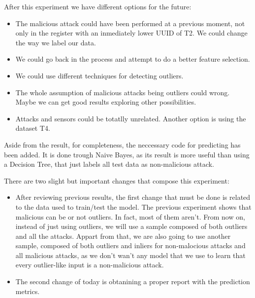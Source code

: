\documentclass[idxtotoc,hyperref,openany]{labbook} %
\begin{document}
After this experiment we have different options for the future:
\begin{itemize}
  \item The malicious attack could have been performed at a previous moment, not only in the register with an inmediately lower UUID of T2. We could change the way we label our data. 
  \item We could go back in the process and attempt to do a better feature selection.
  \item We could use different techniques for detecting outliers.
  \item The whole assumption of malicious attacks being outliers could wrong. Maybe we can get good results exploring other possibilities.
  \item Attacks and sensors could be totatlly unrelated. Another option is using the dataset T4.
\end{itemize}

Aside from the result, for completeness, the neccessary code for predicting has been added. It is done trough Naive Bayes, as its result is more useful than using a Decision Tree, that just labels all test data as non-malicious attack.




There are two slight but important changes that compose this experiment:
\begin{itemize}
\item After reviewing previous results, the first change that must be done is related to the data used to train/test the model. The previous experiment shows that malicious can be or not outliers. In fact, most of them aren't. From now on, instead of just using outliers, we will use a sample composed of both outliers and all the attacks. Appart from that, we are also going to use another sample, composed of both outliers and inliers for non-malocious attacks and all malicious attacks, as we don't wan't any model that we use to learn that every outlier-like input is a non-malicious attack.
\item The second change of today is obtanining a proper report with the prediction metrics.
\end{itemize}


\end{document}
